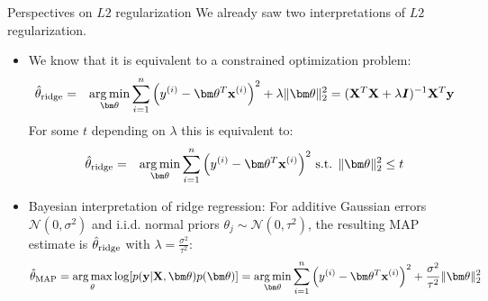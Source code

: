 \documentclass[11pt,compress,t,notes=noshow, xcolor=table]{beamer}
\begin{document}




\begin{vbframe}{Perspectives on $L2$ regularization}
We already saw two interpretations of $L2$ regularization. 
{\small
\begin{itemize}\setlength\itemsep{0.8em}
\item We know that it is equivalent to a constrained optimization problem:
  \begin{eqnarray*}  
  \thetah_{\text{ridge}} &=& \argmin_{\thetav} \sumin \left(\yi - \thetav^T \xi \right)^2 + \lambda \|\thetav\|_2^2 = ({\Xmat}^T \Xmat  + \lambda \id)^{-1} \Xmat^T\yv\\
 \end{eqnarray*}
  For some $t$ depending on $\lambda$ this is equivalent to:
  \begin{eqnarray*}
  \thetah_{\text{ridge}}&=& \argmin_{\thetav} \sumin \left(\yi - \thetav^T \xi\right)^2 \,
  \text{s.t. } \|\thetav\|_2^2  \leq t
  \end{eqnarray*}
  \item Bayesian interpretation of ridge regression: For additive Gaussian errors $\mathcal{N}(0,\sigma^2)$ and i.i.d. normal priors $\theta_j \sim \mathcal{N}(0,\tau^{2})$, the resulting MAP estimate is $\hat{\theta}_{\text{ridge}}$ with $\lambda=\frac{\sigma^2}{\tau^2}$:
  $$\thetah_{\text{MAP}}=\argmax_{\theta} \log[p(\yv|\Xmat,\thetav)p(\thetav)] = \argmin_{\thetav} \sumin \left(\yi - \thetav^T \xi \right)^2 + \frac{\sigma^2}{\tau^2} \|\thetav\|_2^2$$
\end{itemize}
}
\end{vbframe}
\end{document}

